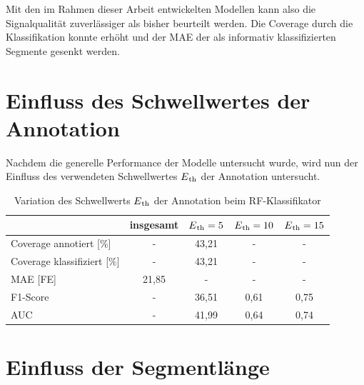  Mit den im Rahmen dieser Arbeit entwickelten Modellen kann also die Signalqualität zuverlässiger als bisher beurteilt werden. Die Coverage durch die Klassifikation konnte erhöht und der \ac{MAE} der als informativ klassifizierten Segmente gesenkt werden.

\section{Einfluss des Schwellwertes der Annotation}

Nachdem die generelle Performance der Modelle untersucht wurde, wird nun der Einfluss des verwendeten Schwellwertes $E\textsubscript{th}$ der Annotation untersucht. %

\begin{table}[H]
	\centering
	\begin{tabular}{l || c | c | c | c }
								& insgesamt	& $E\textsubscript{th}=5$	& $E\textsubscript{th}=10$	& $E\textsubscript{th}=15$	\\ \hline
	Coverage annotiert [\%]		& -			& 43{,}21					& - 						& -		\\
 	Coverage klassifiziert [\%]	& -			& 43{,}21					& - 						& -		\\
 	\ac{MAE} [FE]				& 21{,}85	& -							& - 						& -		\\
 	F1-Score 					& -			& 36,51						& 0,61						& 0,75	\\%
 	AUC 						& -			& 41,99						& 0,64						& 0,74	\\%
 	\end{tabular}	
	\caption{Variation des Schwellwerts $E\textsubscript{th}$ der Annotation beim \ac{RF}-Klassifikator}
	\label{fig:rf-clf-e-th}
\end{table}


\section{Einfluss der Segmentlänge}



